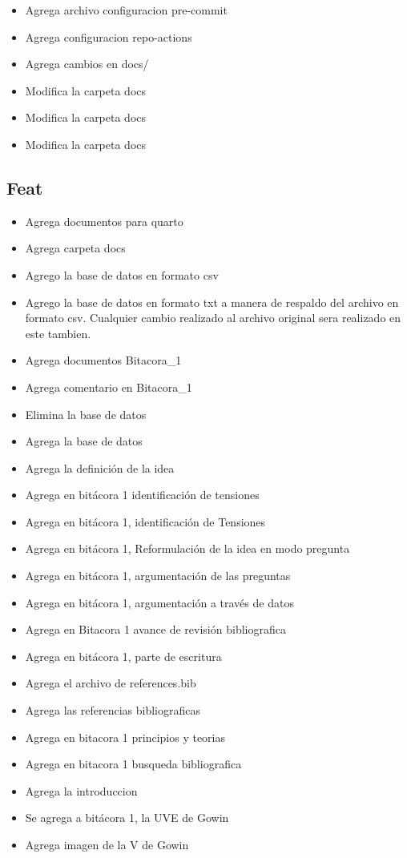 \documentclass[
  letterpaper,
  DIV=11,
  numbers=noendperiod]{scrreprt}
\providecommand{\tightlist}{%
  \setlength{\itemsep}{0pt}\setlength{\parskip}{0pt}}\usepackage{longtable,booktabs,array}
\begin{document}
\begin{itemize}
\tightlist
\item
  Agrega archivo configuracion pre-commit
\item
  Agrega configuracion repo-actions
\item
  Agrega cambios en docs/
\item
  Modifica la carpeta docs
\item
  Modifica la carpeta docs
\item
  Modifica la carpeta docs
\end{itemize}

\subsection{Feat}\label{feat}

\begin{itemize}
\tightlist
\item
  Agrega documentos para quarto
\item
  Agrega carpeta docs
\item
  Agrego la base de datos en formato csv
\item
  Agrego la base de datos en formato txt a manera de respaldo del
  archivo en formato csv. Cualquier cambio realizado al archivo original
  sera realizado en este tambien.
\item
  Agrega documentos Bitacora\_1
\item
  Agrega comentario en Bitacora\_1
\item
  Elimina la base de datos
\item
  Agrega la base de datos
\item
  Agrega la definición de la idea
\item
  Agrega en bitácora 1 identificación de tensiones
\item
  Agrega en bitácora 1, identificación de Tensiones
\item
  Agrega en bitácora 1, Reformulación de la idea en modo pregunta
\item
  Agrega en bitácora 1, argumentación de las preguntas
\item
  Agrega en bitácora 1, argumentación a través de datos
\item
  Agrega en Bitacora 1 avance de revisión bibliografica
\item
  Agrega en bitácora 1, parte de escritura
\item
  Agrega el archivo de references.bib
\item
  Agrega las referencias bibliograficas
\item
  Agrega en bitacora 1 principios y teorias
\item
  Agrega en bitacora 1 busqueda bibliografica
\item
  Agrega la introduccion
\item
  Se agrega a bitácora 1, la UVE de Gowin
\item
  Agrega imagen de la V de Gowin
\end{itemize}
\end{document}
